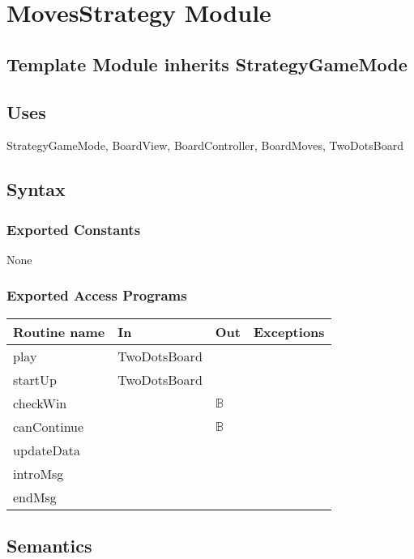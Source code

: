 \documentclass[12pt]{article}
\begin{document}
\newpage

\section* {MovesStrategy Module}

\subsection* {Template Module inherits StrategyGameMode}


\subsection*{Uses}
StrategyGameMode, BoardView, BoardController, BoardMoves, TwoDotsBoard

\subsection* {Syntax}

\subsubsection* {Exported Constants}

None

\subsubsection* {Exported Access Programs}

\begin{tabular}{| l | l | l | p{6cm} |}
\hline
\textbf{Routine name} & \textbf{In} & \textbf{Out} & \textbf{Exceptions}\\
\hline
play & TwoDotsBoard & & \\
\hline
startUp & TwoDotsBoard & & \\
\hline
checkWin & & $\mathbb{B}$ & \\
\hline
canContinue &  & $\mathbb{B}$ & \\
\hline
updateData &  & & \\
\hline
introMsg & & & \\
\hline
endMsg & & & \\
\hline
\end{tabular}

\subsection* {Semantics}
\end{document}
